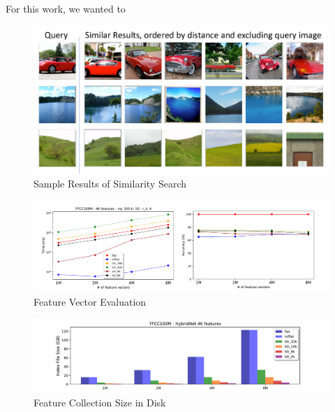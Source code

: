 For this work, we wanted to



\begin{figure}[]
\centering
\includegraphics[width=\textwidth]{figures/feature_img_results}
\caption{Sample Results of Similarity Search}
\label{fig:similarity}
\end{figure}

\begin{figure}[]
\centering
\includegraphics[width=\textwidth]{figures/features_alternatives}
\caption{Feature Vector Evaluation}
\label{fig:features_eval}
\end{figure}

\begin{figure}[]
\centering
\includegraphics[width=\textwidth]{figures/features_disksize}
\caption{Feature Collection Size in Disk}
\label{fig:features_size_does_matter}
\end{figure}
